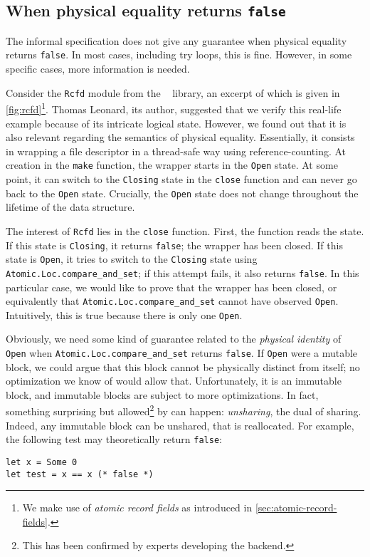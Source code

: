 \subsection{When physical equality returns \texttt{false}}



The informal \OCaml specification does not give any guarantee when physical equality returns \texttt{false}.
In most cases, including try loops, this is fine.
However, in some specific cases, more information is needed.

Consider the \texttt{Rcfd} module from the \Eio~\cite{eio} library, an excerpt of which is given in \cref{fig:rcfd}\footnote{We make use of \emph{atomic record fields} as introduced in \cref{sec:atomic-record-fields}.}.
Thomas Leonard, its author, suggested that we verify this real-life example because of its intricate logical state.
However, we found out that it is also relevant regarding the semantics of physical equality.
Essentially, it consists in wrapping a file descriptor in a thread-safe way using reference-counting.
At creation in the \texttt{make} function, the wrapper starts in the \texttt{Open} state.
At some point, it can switch to the \texttt{Closing} state in the \texttt{close} function and can never go back to the \texttt{Open} state.
Crucially, the \texttt{Open} state does not change throughout the lifetime of the data structure.

The interest of \texttt{Rcfd} lies in the \texttt{close} function.
First, the function reads the state.
If this state is \texttt{Closing}, it returns \texttt{false}; the wrapper has been closed.
If this state is \texttt{Open}, it tries to switch to the \texttt{Closing} state using \texttt{Atomic.Loc.compare_and_set}; if this attempt fails, it also returns \texttt{false}.
In this particular case, we would like to prove that the wrapper has been closed, or equivalently that \texttt{Atomic.Loc.compare_and_set} cannot have observed \texttt{Open}.
Intuitively, this is true because there is only one \texttt{Open}.

Obviously, we need some kind of guarantee related to the \emph{physical identity} of \texttt{Open} when \texttt{Atomic.Loc.compare_and_set} returns \texttt{false}.
If \texttt{Open} were a mutable block, we could argue that this block cannot be physically distinct from itself; no optimization we know of would allow that.
Unfortunately, it is an immutable block, and immutable blocks are subject to more optimizations.
In fact, something surprising but allowed\footnote{This has been confirmed by \OCaml experts developing the \Flambda backend.} by \OCaml can happen: \emph{unsharing}, the dual of sharing.
Indeed, any immutable block can be unshared, that is reallocated.
For example, the following test may theoretically return \texttt{false}:
\begin{verbatim}
let x = Some 0
let test = x == x (* false *)
\end{verbatim}

